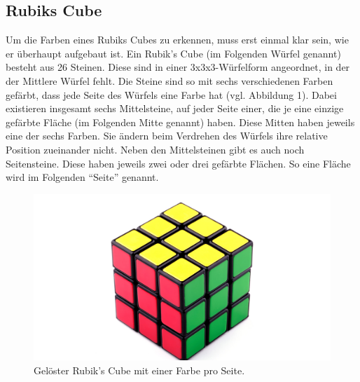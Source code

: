 \documentclass[a4paper, 12pt]{article}
\begin{document}
\subsection{Rubiks Cube}
Um die Farben eines Rubiks Cubes zu erkennen, muss erst einmal klar sein, wie er überhaupt aufgebaut ist. Ein Rubik's Cube (im Folgenden Würfel genannt) besteht aus 26 Steinen. Diese sind in einer 3x3x3-Würfelform angeordnet, in der der Mittlere Würfel fehlt. Die Steine sind so mit sechs verschiedenen Farben gefärbt, dass jede Seite des Würfels eine Farbe hat (vgl. Abbildung 1). Dabei existieren insgesamt sechs Mittelsteine, auf jeder Seite einer, die je eine einzige gefärbte Fläche (im Folgenden Mitte genannt) haben. Diese Mitten haben jeweils eine der sechs Farben. Sie ändern beim Verdrehen des Würfels ihre relative Position zueinander nicht. Neben den Mittelsteinen gibt es auch noch Seitensteine. Diese haben jeweils zwei oder drei gefärbte Flächen. So eine Fläche wird im Folgenden "`Seite"' genannt.
\begin{figure}[H]
\includegraphics[scale=1.5]{Wuerfel_Billd}
\caption{Gelöster Rubik's Cube mit einer Farbe pro Seite. \cite{Wuerfelbild}}
\end{figure}
\end{document}
